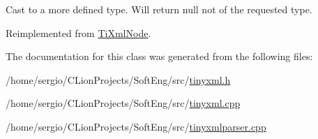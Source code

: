 Cast to a more defined type. Will return null not of the requested type. 



Reimplemented from \hyperlink{class_ti_xml_node_a6a4c8ac28ee7a745d059db6691e03bae}{Ti\+Xml\+Node}.



The documentation for this class was generated from the following files\+:\begin{DoxyCompactItemize}
\item 
/home/sergio/\+C\+Lion\+Projects/\+Soft\+Eng/src/\hyperlink{tinyxml_8h}{tinyxml.\+h}\item 
/home/sergio/\+C\+Lion\+Projects/\+Soft\+Eng/src/\hyperlink{tinyxml_8cpp}{tinyxml.\+cpp}\item 
/home/sergio/\+C\+Lion\+Projects/\+Soft\+Eng/src/\hyperlink{tinyxmlparser_8cpp}{tinyxmlparser.\+cpp}\end{DoxyCompactItemize}
